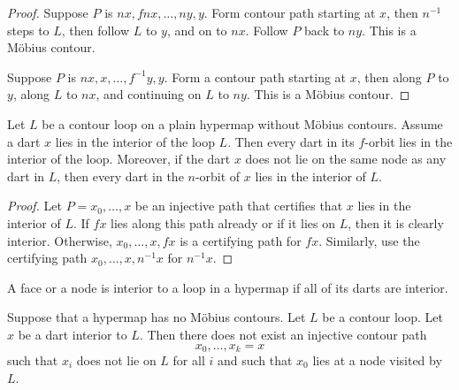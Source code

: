 \begin{proof}  Suppose $P$ is $n x,f n x,\ldots,n y,y$.   Form
contour path starting at $x$, then $n^{-1}$ steps to $L$, then
follow $L$ to $y$, and on to $n x$.  Follow $P$ back to $n y$.  This
is a M\"obius contour.

Suppose $P$ is $n x,x,\ldots,f^{-1} y,y$.  Form a contour path
starting at $x$, then along $P$ to $y$, along $L$ to $n x$, and
continuing on $L$ to $n y$.  This is a M\"obius contour.
\end{proof}




\begin{lemma}
Let $L$ be a contour loop on a plain hypermap without
M\"obius contours.  Assume a dart $x$ lies in the interior of the loop $L$. 
Then every dart in its $f$-orbit lies in
the interior of the loop.  Moreover, if the dart
$x$ does not lie on the same node as any dart in $L$, then every
dart in the $n$-orbit of $x$ lies in the interior 
of $L$.
\end{lemma}

\begin{proof} Let $P= x_0,\ldots,x$ be an injective path that certifies that $x$ lies
in the interior of $L$.  If $f x$ lies along this path already or if it lies on $L$,
then it is clearly interior.  Otherwise, $x_0,\ldots,x,f x$ is a certifying path
for $f x$.  Similarly, use the certifying path $x_0,\ldots,x,n^{-1} x$ for $n^{-1} x$.
\end{proof}


\begin{definition}  A face or a node is interior to a
loop in a hypermap if all of its darts are interior.
\end{definition}

\begin{lemma}
Suppose that a hypermap has no M\"obius contours.  Let $L$ be a contour loop.
Let $x$ be a dart interior to $L$.  Then there does not exist an injective contour path
$$x_0,\ldots,x_k=x$$
such that $x_i$ does not lie on $L$ for all $i$ and such that $x_0$ lies at a node
visited by $L$.
\end{lemma}


